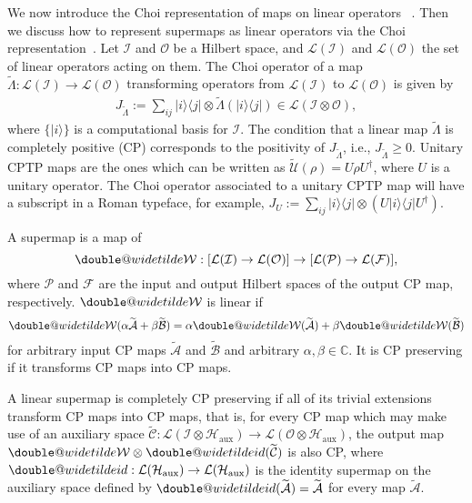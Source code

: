 \documentclass[a4paper,twocolumn,accepted=2022-10-23]{quantumarticle}
\makeatletter
\newcommand{\ket}[1]{\vert {#1} \rangle}
\newcommand{\ketbra}[2]{\vert {#1} \rangle\!\langle {#2} \vert}
\newcommand{\fcal}[0]{{\mathcal{F}}}
\newcommand{\ical}[0]{{\mathcal{I}}}
\newcommand{\ocal}[0]{{\mathcal{O}}}
\newcommand{\pcal}[0]{{\mathcal{P}}}
\newcommand{\lcal}[0]{{\mathcal{L}}}
\newcommand{\doublewidetilde}[1]{{%
  \mathpalette\double@widetilde{#1}%
}}
\newcommand{\double@widetilde}[2]{%
  \sbox\z@{$\m@th#1\widetilde{#2}$}%
  \ht\z@=.9\ht\z@
  \widetilde{\box\z@}%
}
\newcommand{\ttsmap}[1]{\doublewidetilde{\mbox{$\mathcal{#1}$}}}
\newcommand{\smap}[1]{\doublewidetilde{\mbox{$#1$}}}
\newcommand{\tmap}[1]{\widetilde{\mbox{$\mathcal{#1}$}}}
\newcommand{\tmapf}[1]{\widetilde{\mbox{$#1$}}}
\theoremstyle{definition}
\makeatother
\begin{document}
We now introduce the Choi representation of maps on linear operators ~\cite{choi,jamiolkowski}. Then we discuss how to represent supermaps as linear operators via the Choi representation~\cite{comb1,comb3}. Let $\mathcal{I}$ and $\mathcal{O}$ be a Hilbert space, and $\mathcal{L}(\mathcal{I})$ and $\mathcal{L}(\mathcal{O})$ the set of linear operators acting on them. The Choi operator of a map $\tmapf{\Lambda}: \lcal(\ical) \to \lcal(\ocal)$ transforming operators from $\mathcal{L}(\mathcal{I})$ to $\mathcal{L}(\mathcal{O})$ is given by
\begin{align}
J_{\tilde{\Lambda}} := \sum_{ij} \ketbra{i}{j} \otimes \tmapf{\Lambda}( \ketbra{i}{j}) \in \lcal(\ical \otimes \ocal),
\end{align}
where $\{ \ket{i} \}$ is a computational basis for $\ical$.
The condition that a linear map $\tmapf{\Lambda}$ is completely positive (CP) corresponds to the positivity of $J_{\tilde{\Lambda}}$, i.e., $J_{\tilde{\Lambda}} \geq 0$.
Unitary CPTP maps are the ones which can be written as $\tmap{U}(\rho)=U\rho U^\dagger$, where $U$ is a unitary operator.
The Choi operator associated to a unitary CPTP map will have a subscript in a Roman typeface, for example, $J_U := \sum_{ij} \ketbra{i}{j} \otimes (U \ketbra{i}{j}U^\dagger)$.


A supermap is a map of
\begin{equation} \label{eq:smap}
  \ttsmap{W}:  [\lcal(\ical) \to  \lcal(\ocal)]  \to
	  [\lcal(\pcal) \to  \lcal(\fcal)],
\end{equation}
where $\pcal$ and $\fcal$ are the input and output Hilbert spaces of the output CP map, respectively.
$\ttsmap{W}$ is linear if
\begin{equation}
  \ttsmap{W} (\alpha \tmap{A} + \beta \tmap{B}) = \alpha \ttsmap{W} ( \tmap{A}) + \beta \ttsmap{W} ( \tmap{B} )
\end{equation}
for arbitrary input CP maps $\tmap{A}$ and $\tmap{B}$ and arbitrary $\alpha, \beta \in \mathbb{C}$.
It is CP preserving if it transforms CP maps into CP maps.

A linear supermap is completely CP preserving if all of its trivial extensions transform CP maps into CP maps, that is, for every CP map which may make use of an auxiliary space $\tmap{C}:\lcal(\ical\otimes \mathcal{H}_\text{aux}) \to  \lcal(\ocal\otimes\mathcal{H}_\text{aux})$,  the output map $\ttsmap{W} \otimes \smap{id}( \tmap{C} )$
is also CP, where $\smap{id}:\lcal(\mathcal{H}_\text{aux}) \to  \lcal(\mathcal{H}_\text{aux})$ is the identity supermap on the auxiliary space defined by $\smap{id}(\tmap{A})=\tmap{A}$ for every map $\tmap{A}$.
\end{document}
